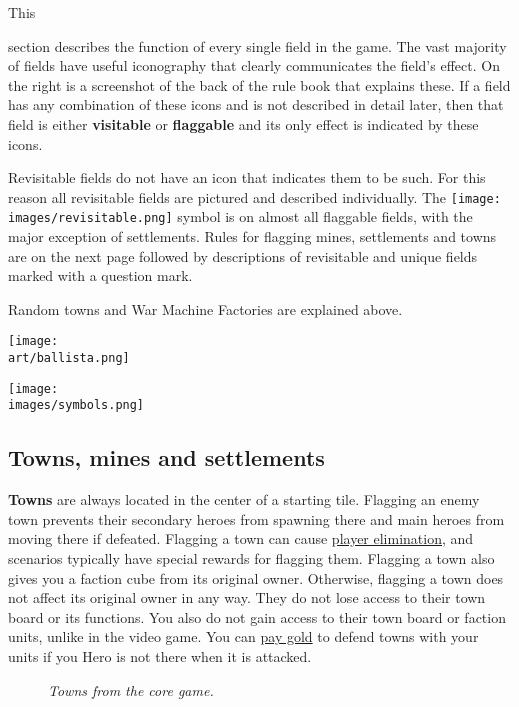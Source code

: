
\begin{multicols}{2}

\hypertarget{All}{This} section describes the function of every single field in the game.
The vast majority of fields have useful iconography that clearly communicates the field's effect.
On the right is a screenshot of the back of the rule book that explains these.
If a field has any combination of these icons and is not described in detail later, then that field is either \textbf{visitable} or \textbf{flaggable} and its only effect is indicated by these icons.\par
Revisitable fields do not have an icon that indicates them to be such.
For this reason all revisitable fields are pictured and described individually.
The \texttt{[image: \\images/revisitable.png]} symbol is on almost all flaggable fields, with the major exception of settlements.
Rules for flagging mines, settlements and towns are on the next page followed by descriptions of revisitable and unique fields marked with a question mark.\par
Random towns and War Machine Factories are explained above.

\vfill
\begin{center}
  \hspace{-14em}
  \texttt{[image: \\art/ballista.png]}
\end{center}

\begin{center}
  \texttt{[image: \\images/symbols.png]}
\end{center}

\clearpage
\subsection*{Towns, mines and settlements}
\textbf{Towns} are always located in the center of a starting tile.
Flagging an enemy town prevents their secondary heroes from spawning there and main heroes from moving there if defeated.
Flagging a town can cause \hyperlink{End}{player elimination}, and scenarios typically have special rewards for flagging them.
Flagging a town also gives you a faction cube from its original owner.
Otherwise, flagging a town does not affect its original owner in any way.
They do not lose access to their town board or its functions.
You also do not gain access to their town board or faction units, unlike in the video game.
You can \hyperlink{Town}{pay gold} to defend towns with your units if you Hero is not there when it is attacked.\\
\begin{figure}[h]
\centering
{}
\caption{\textit{Towns from the core game.}}
\end{figure}


\end{multicols}
